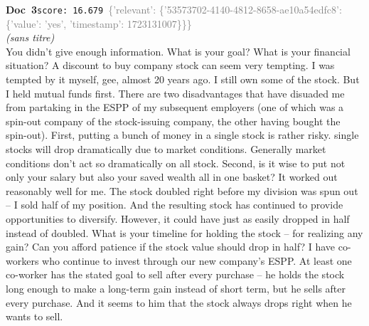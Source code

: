 \documentclass[a4paper,11pt]{article}
\begin{document}
\begin{docenv}
{\footnotesize\textcolor{doccolor}{\textbf{Doc~3}}}\hfill{\tiny\texttt{score:~16.679}}\ {\tiny\textcolor{gray}{\{'relevant': \{'53573702-4140-4812-8658-ae10a54edfc8': \{'value': 'yes', 'timestamp': 1723131007\}\}\}}}\\[3pt]
{\small\textit{(sans titre)}}\\[2pt]
\vspace{2pt}
{\footnotesize 
You didn't give enough information.  What is your goal?  What is your financial situation?   A discount to buy company stock can seem very tempting.  I was tempted by it myself, gee, almost 20 years ago.  I still own some of the stock.  But I held mutual funds first. There are two disadvantages that have disuaded me from partaking in the ESPP of my subsequent employers (one of which was a spin-out company of the stock-issuing company, the other having bought the spin-out).  First, putting a bunch of money in a single stock is rather risky.  single stocks will drop dramatically due to market conditions.  Generally market conditions don't act so dramatically on all stock.  Second, is it wise to put not only your salary but also your saved wealth all in one basket? It worked out reasonably well for me.  The stock doubled right before my division was spun out -- I sold half of my position.    And the resulting stock has continued to provide opportunities to diversify.  However, it could have just as easily dropped in half instead of doubled. What is your timeline for holding the stock -- for realizing any gain?  Can you afford patience if the stock value should drop in half? I have co-workers who continue to invest through our new company's ESPP.  At least one co-worker has the stated goal to sell after every purchase -- he holds the stock long enough to make a long-term gain instead of short term, but he sells after every purchase.  And it seems to him that the stock always drops right when he wants to sell.}
\end{docenv}
\end{document}
